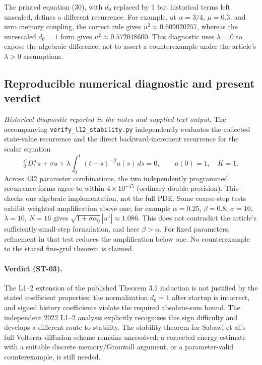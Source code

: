 \documentclass[11pt]{amsart}
\numberwithin{equation}{section}
\theoremstyle{remark}
\newcommand{\abs}[1]{\left\lvert #1\right\rvert}
\newcommand{\Caputo}{{}^{C}_{0}D_t^\alpha}
\begin{document}
The printed equation (30), with $d_0$ replaced by 1 but historical terms
left unscaled, defines a different recurrence. For example, at $\alpha=3/4$,
$\mu=0.3$, and zero memory coupling, the correct rule gives
$u^2\approx0.609020257$, whereas the unrescaled $d_0=1$ form gives
$u^2\approx0.572048600$. This diagnostic uses $\lambda=0$ to expose the
algebraic difference, not to assert a counterexample under the article's
$\lambda>0$ assumptions.

\subsection{Reproducible numerical diagnostic and present verdict}
\textit{Historical diagnostic reported in the notes and supplied text output.}
The accompanying \texttt{verify\_l12\_stability.py} independently evaluates
the collected state-value recurrence and the direct backward-increment
recurrence for the scalar equation
\[
\Caputo u+\sigma u+\lambda\int_0^t(t-s)^{-\beta}u(s)\,ds=0,
\qquad u(0)=1,\quad K=1.
\]
Across 432 parameter combinations, the two independently programmed
recurrence forms agree to within $4\times10^{-15}$ (ordinary double
precision). This checks our algebraic implementation, not the full PDE.
Some coarse-step tests exhibit weighted amplification above one; for example
$\alpha=0.25$, $\beta=0.8$, $\sigma=10$, $\lambda=10$, $N=16$ gives
$\sqrt{1+\sigma\alpha_0}\abs{u^1}\approx1.086$. This does not contradict
the article's sufficiently-small-step formulation, and here $\beta>\alpha$.
For fixed parameters, refinement in that test reduces the amplification
below one. No counterexample to the stated fine-grid theorem is claimed.

\paragraph{Verdict (ST-03).}
The L1--2 extension of the published Theorem 3.1 induction is not justified
by the stated coefficient properties: the normalization $d_0=1$ after
startup is incorrect, and signed history coefficients violate the required
absolute-sum bound. The independent 2022 L1--2 analysis explicitly recognizes
this sign difficulty and develops a different route to stability. The
stability theorem for Sabawi et al.'s full Volterra--diffusion scheme
remains unresolved; a corrected energy estimate with a suitable discrete
memory/Gronwall argument, or a parameter-valid counterexample, is still needed.
\end{document}
